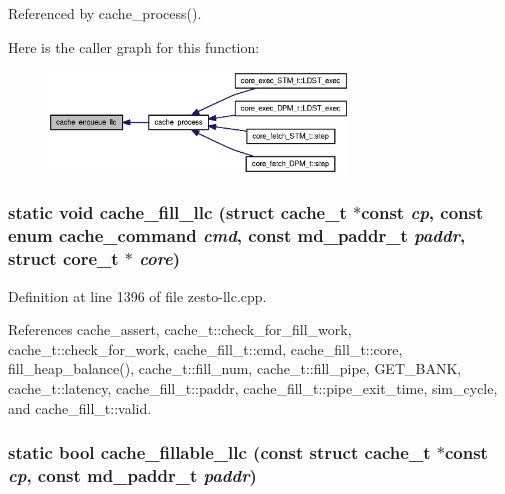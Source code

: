 Referenced by cache\_\-process().

Here is the caller graph for this function:\nopagebreak
\begin{figure}[H]
\begin{center}
\leavevmode
\includegraphics[width=226pt]{zesto-llc_8cpp_6955e78ccb0fb1511754e8cd113e1dcc_icgraph}
\end{center}
\end{figure}
\subsubsection[{cache\_\-fill\_\-llc}]{\setlength{\rightskip}{0pt plus 5cm}static void cache\_\-fill\_\-llc (struct {\bf cache\_\-t} $\ast$const  {\em cp}, \/  const enum {\bf cache\_\-command} {\em cmd}, \/  const {\bf md\_\-paddr\_\-t} {\em paddr}, \/  struct {\bf core\_\-t} $\ast$ {\em core})\hspace{0.3cm}{\tt  [inline, static]}}\label{zesto-llc_8cpp_acfad7c90ec1f20c91ccfcae11d67dea}




Definition at line 1396 of file zesto-llc.cpp.

References cache\_\-assert, cache\_\-t::check\_\-for\_\-fill\_\-work, cache\_\-t::check\_\-for\_\-work, cache\_\-fill\_\-t::cmd, cache\_\-fill\_\-t::core, fill\_\-heap\_\-balance(), cache\_\-t::fill\_\-num, cache\_\-t::fill\_\-pipe, GET\_\-BANK, cache\_\-t::latency, cache\_\-fill\_\-t::paddr, cache\_\-fill\_\-t::pipe\_\-exit\_\-time, sim\_\-cycle, and cache\_\-fill\_\-t::valid.
\subsubsection[{cache\_\-fillable\_\-llc}]{\setlength{\rightskip}{0pt plus 5cm}static bool cache\_\-fillable\_\-llc (const struct {\bf cache\_\-t} $\ast$const  {\em cp}, \/  const {\bf md\_\-paddr\_\-t} {\em paddr})\hspace{0.3cm}{\tt  [inline, static]}}\label{zesto-llc_8cpp_9c38467a1f69e44fd7487395ba6ff279}




